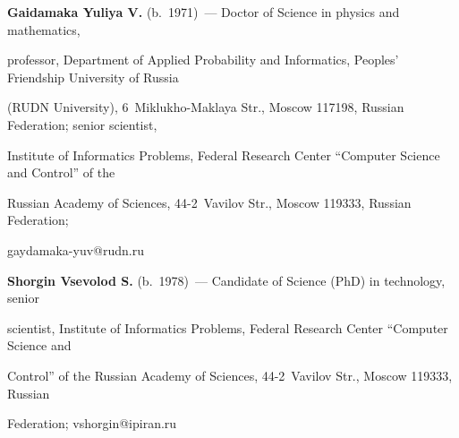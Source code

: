 \noindent


\textbf{Gaidamaka Yuliya V.} (b.\ 1971)~--- Doctor of Science in physics and mathematics, 


professor, Department of Applied Probability and Informatics, Peoples' Friendship University of Russia 


(RUDN University), 6~Miklukho-Maklaya Str., Moscow 117198, Russian Federation; senior scientist, 


Institute of Informatics Problems, Federal Research Center ``Computer Science and Control'' of the 


Russian Academy of Sciences, 44-2~Vavilov Str., Moscow 119333, Russian Federation;  


\mbox{gaydamaka-yuv@rudn.ru}





\vspace*{3pt}





\noindent


\textbf{Shorgin Vsevolod S.} (b.\ 1978)~--- Candidate of Science (PhD) in technology, senior 


scientist, Institute of Informatics Problems, Federal Research Center ``Computer Science and 


Control'' of the Russian Academy of Sciences, 44-2~Vavilov Str., Moscow 119333, Russian 


Federation; \mbox{vshorgin@ipiran.ru}


\label{end\stat}





\renewcommand{\bibname}{\protect\rm Литература} 


